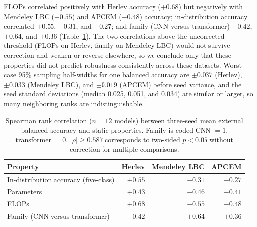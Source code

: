 \documentclass[12pt,letterpaper]{article}
\begin{document}
FLOPs correlated positively with Herlev accuracy ($+0.68$) but negatively with Mendeley LBC ($-0.55$) and APCEM ($-0.48$) accuracy; in-distribution accuracy correlated $+0.55$, $-0.31$, and $-0.27$; and family (CNN versus transformer) $-0.42$, $+0.64$, and $+0.36$ (Table~\ref{tab:rho}). The two correlations above the uncorrected threshold (FLOPs on Herlev, family on Mendeley LBC) would not survive correction and weaken or reverse elsewhere, so we conclude only that these properties did not predict robustness consistently across these datasets. Worst-case 95\% sampling half-widths for one balanced accuracy are $\pm0.037$ (Herlev), $\pm0.033$ (Mendeley LBC), and $\pm0.019$ (APCEM) before seed variance, and the seed standard deviations (median 0.025, 0.051, and 0.034) are similar or larger, so many neighboring ranks are indistinguishable.

\begin{table}[htbp]
\centering
\caption{Spearman rank correlation ($n=12$ models) between three-seed mean external balanced accuracy and static properties. Family is coded CNN $=1$, transformer $=0$. $|\rho|\geq 0.587$ corresponds to two-sided $p<0.05$ without correction for multiple comparisons.}
\label{tab:rho}
\small
\begin{tabular}{lrrr}
\toprule
Property & Herlev & Mendeley LBC & APCEM \\
\midrule
In-distribution accuracy (five-class) & $+0.55$ & $-0.31$ & $-0.27$ \\
Parameters & $+0.43$ & $-0.46$ & $-0.41$ \\
FLOPs & $+0.68$ & $-0.55$ & $-0.48$ \\
Family (CNN versus transformer) & $-0.42$ & $+0.64$ & $+0.36$ \\
\bottomrule
\end{tabular}
\end{table}
\end{document}
